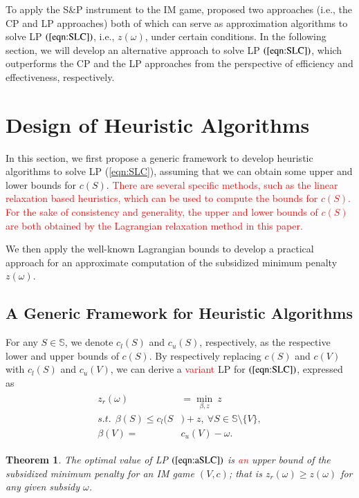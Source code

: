 \documentclass[authoryear,review,12pt]{elsarticle}
\newtheorem{theorem}{Theorem}
\begin{document}
To apply the S\&P instrument to the IM game, \cite{leastcore2018} proposed two approaches (i.e., the CP and LP approaches) both of which can serve as approximation algorithms to solve LP $(\ref{eqn:SLC})$, i.e., $z(\omega)$, under certain conditions.
In the following section, we will develop an alternative approach to solve LP $(\ref{eqn:SLC})$, which outperforms the CP and the LP approaches from the perspective of efficiency and effectiveness, respectively.


\section{Design of Heuristic Algorithms}\label{section:general}
In this section, we first propose a generic framework to develop heuristic algorithms to solve LP (\ref{eqn:SLC}), assuming that we can obtain some upper and lower bounds for $c(S)$.
\textcolor{red}{There are several specific methods, such as the linear relaxation based heuristics, which can be used to compute the bounds for $c(S)$. For the sake of consistency and generality, the upper and lower bounds of $c(S)$ are both obtained by the Lagrangian relaxation method in this paper.}

We then apply the well-known Lagrangian bounds to
develop a practical approach for an approximate computation of the subsidized minimum penalty $z(\omega)$.


\subsection{A Generic Framework for Heuristic Algorithms}

For any $S \in \mathbb{S}$, we denote $c_l(S)$ and $c_u(S)$, respectively, as the respective lower and upper bounds of $c(S)$. By respectively replacing $c(S)$ and $c(V)$ with $c_l(S)$ and $c_u(V)$, we can derive a \textcolor{red}{variant} LP for $(\ref{eqn:SLC})$,
expressed as
\begin{eqnarray}\label{eqn:aSLC}
\begin{aligned}
z_r(\omega) &= \min_{\beta,z}~ z\\
s.t.~~\beta(S) \leq c_l(S&)+z,~\forall S \in \mathbb{S} \setminus \big\{V\big\},\\
\beta(V)=&c_u(V)-\omega.
\end{aligned}
\end{eqnarray}


\begin{theorem}\label{thm:rb}
The optimal value of LP $(\ref{eqn:aSLC})$ is \textcolor{red}{an} upper bound of the subsidized minimum penalty for an IM game $(V,c)$; that is $z_r(\omega) \geq z(\omega)$ for any given subsidy $\omega$.
\end{theorem}
\end{document}
